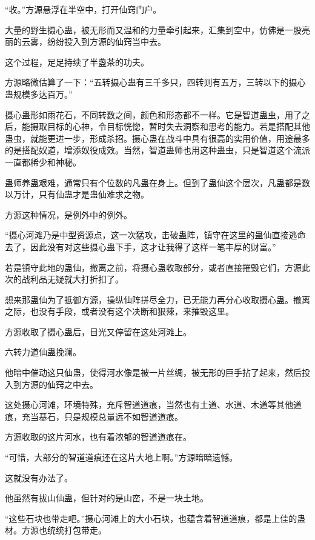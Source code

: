 
\begin{this_body}

“收。”方源悬浮在半空中，打开仙窍门户。

大量的野生摄心蛊，被无形而又温和的力量牵引起来，汇集到空中，仿佛是一股亮丽的云雾，纷纷投入到方源的仙窍当中去。

这个过程，足足持续了半盏茶的功夫。

方源略微估算了一下：“五转摄心蛊有三千多只，四转则有五万，三转以下的摄心蛊规模多达百万。”

摄心蛊形如雨花石，不同转数之间，颜色和形态都不一样。它是智道蛊虫，用了之后，能摄取目标的心神，令目标恍惚，暂时失去洞察和思考的能力。若是搭配其他蛊虫，就能更进一步，形成杀招。摄心蛊在战斗中具有很高的实用价值，用途最多的是搭配奴道，增添奴役成效。当然，智道蛊师也用这种蛊虫，只是智道这个流派一直都稀少和神秘。

蛊师养蛊艰难，通常只有个位数的凡蛊在身上。但到了蛊仙这个层次，凡蛊都是数以万计，只有仙蛊才是蛊仙难求之物。

方源这种情况，是例外中的例外。

“摄心河滩乃是中型资源点，这一次猛攻，击破蛊阵，镇守在这里的蛊仙直接逃命去了，因此没有对这些摄心蛊下手，这才让我得了这样一笔丰厚的财富。”

若是镇守此地的蛊仙，撤离之前，将摄心蛊收取部分，或者直接摧毁它们，方源此次的战利品无疑就大打折扣了。

想来那蛊仙为了抵御方源，操纵仙阵拼尽全力，已无能力再分心收取摄心蛊。撤离之际，也没有手段，或者没有这个决断和狠辣，来摧毁这里。

方源收取了摄心蛊后，目光又停留在这处河滩上。

六转力道仙蛊挽澜。

他暗中催动这只仙蛊，使得河水像是被一片丝绸，被无形的巨手拈了起来，然后投入到方源的仙窍之中去。

这处摄心河滩，环境特殊，充斥智道道痕，当然也有土道、水道、木道等其他道痕，充当基石，只是规模总量远不如智道道痕。

方源收取的这片河水，也有着浓郁的智道道痕在。

“可惜，大部分的智道道痕还在这片大地上啊。”方源暗暗遗憾。

这就没有办法了。

他虽然有拔山仙蛊，但针对的是山峦，不是一块土地。

“这些石块也带走吧。”摄心河滩上的大小石块，也蕴含着智道道痕，都是上佳的蛊材。方源也统统打包带走。


\end{this_body}
